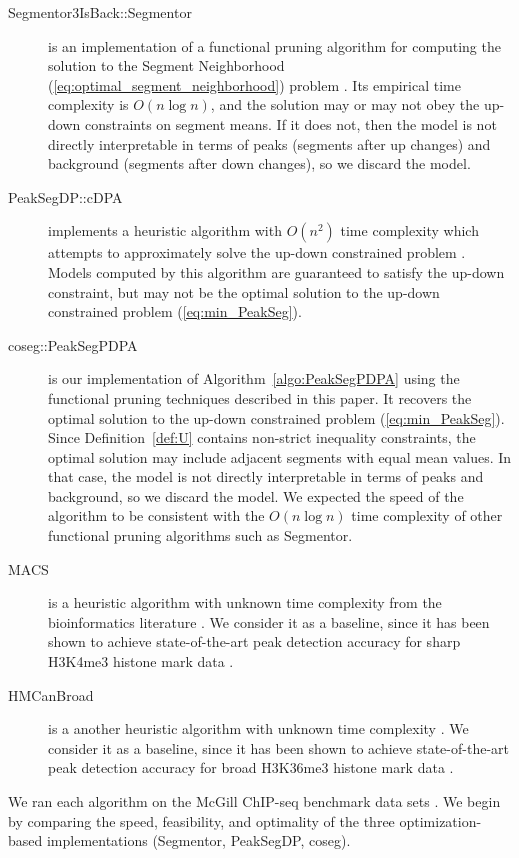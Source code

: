 \documentclass{article}
\begin{document}
\begin{description}
\item[Segmentor3IsBack::Segmentor] is an implementation of a
  functional pruning algorithm for computing the solution to the
  Segment Neighborhood (\ref{eq:optimal_segment_neighborhood}) problem
  \citep{Segmentor}. Its empirical time complexity is $O(n \log n)$,
  and the solution may or may not obey the up-down constraints on
  segment means. If it does not, then the model is not directly
  interpretable in terms of peaks (segments after up changes) and
  background (segments after down changes), so we discard the model.
\item[PeakSegDP::cDPA] implements a heuristic algorithm with $O(n^2)$
  time complexity which attempts to approximately solve the up-down
  constrained problem \citep{HOCKING-PeakSeg}. Models computed by this
  algorithm are guaranteed to satisfy the up-down constraint, but may
  not be the optimal solution to the up-down constrained problem
  (\ref{eq:min_PeakSeg}).
\item[coseg::PeakSegPDPA] is our implementation of
  Algorithm~\ref{algo:PeakSegPDPA} using the functional pruning
  techniques described in this paper. It recovers the optimal solution
  to the up-down constrained problem (\ref{eq:min_PeakSeg}).  Since
  Definition~\ref{def:U} contains non-strict inequality constraints,
  the optimal solution may include adjacent segments with equal mean
  values. In that case, the model is not directly interpretable in
  terms of peaks and background, so we discard the model. We expected
  the speed of the algorithm to be consistent with the $O(n\log n)$
  time complexity of other functional pruning algorithms such as
  Segmentor.
\item[MACS] is a heuristic algorithm with unknown time complexity from
  the bioinformatics literature \citep{MACS}. We consider it as a
  baseline, since it has been shown to achieve state-of-the-art peak
  detection accuracy for sharp H3K4me3 histone mark data
  \citep{HOCKING-PeakSeg}.
\item[HMCanBroad] is a another heuristic algorithm with unknown time
  complexity \citep{HMCan}. We consider it as a baseline, since it has
  been shown to achieve state-of-the-art peak detection accuracy for
  broad H3K36me3 histone mark data \citep{HOCKING-PeakSeg}.
\end{description}

We ran each algorithm on the McGill ChIP-seq benchmark data sets
\citep{HOCKING2016-chipseq}. We begin by comparing the speed,
feasibility, and optimality of the three optimization-based
implementations (Segmentor, PeakSegDP, coseg).
\end{document}
